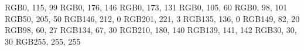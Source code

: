 \definecolor{JungleGreen}       {RGB}{0, 115, 99} 	    %
\definecolor{SeaGreen}          {RGB}{0, 176, 146} 	    %
\definecolor{Green}             {RGB}{0, 173, 131} 	    %
\definecolor{ForestGreen}       {RGB}{0, 105, 60} 	    %
\definecolor{PineGreen}         {RGB}{0, 98, 101} 	    %
\definecolor{LimeGreen}         {RGB}{50, 205, 50} 	    %
\definecolor{YellowGreen}       {RGB}{146, 212, 0} 	    %
\definecolor{SpringGreen}       {RGB}{201, 221, 3} 	    %
\definecolor{OliveGreen}        {RGB}{135, 136, 0} 	    %
\definecolor{RawSienna}         {RGB}{149, 82, 20} 	    %
\definecolor{Sepia}             {RGB}{98, 60, 27} 	    %
\definecolor{Brown}             {RGB}{134, 67, 30}      %
\definecolor{Tan}               {RGB}{210, 180, 140}	%
\definecolor{Gray}              {RGB}{139, 141, 142} 	%
\definecolor{Black}		  	    {RGB}{30, 30, 30}       %
\definecolor{White}		  	    {RGB}{255, 255, 255}    %

